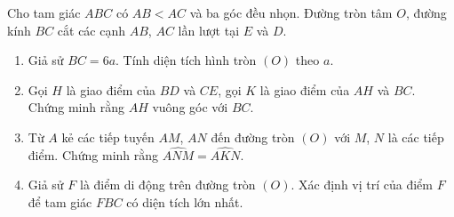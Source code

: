 \begin{ex}%
Cho tam giác $ABC$ có $AB<AC$ và ba góc đều nhọn. Đường tròn tâm $O$, đường kính $BC$ cắt các cạnh $AB$, $AC$ lần lượt tại $E$ và $D$.
\begin{enumerate}
\item Giả sử $BC=6a$. Tính diện tích hình tròn $(O)$ theo $a$.
\item Gọi $H$ là giao điểm của $BD$ và $CE$, gọi $K$ là giao điểm của $AH$ và $BC$. Chứng minh rằng $AH$ vuông góc với $BC$.
\item Từ $A$ kẻ các tiếp tuyến $AM$, $AN$ đến đường tròn $(O)$ với $M$, $N$ là các tiếp điểm. Chứng minh rằng $\widehat{ANM}=\widehat{AKN}$.
\item Giả sử $F$ là điểm di động trên đường tròn $(O)$. Xác định vị trí của điểm $F$ để tam giác $FBC$ có diện tích lớn nhất.
\end{enumerate}
\end{ex}
